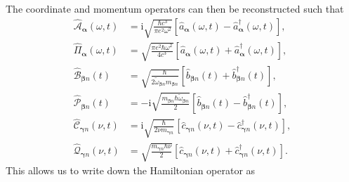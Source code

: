 \documentclass{article}
\begin{document}
The coordinate and momentum operators can then be reconstructed such that
\begin{equation}
\begin{split}
\hat{\mathcal{A}}_{\bm{\alpha}}(\omega,t) &= \mathrm{i}\sqrt{\frac{\hbar c^3}{\pi e^2\omega^2}}\left[\hat{a}_{\bm{\alpha}}(\omega,t) - \hat{a}_{\bm{\alpha}}^\dagger(\omega,t)\right],\\
\hat{\mathit{\Pi}}_{\bm{\alpha}}(\omega,t) &= \sqrt{\frac{\pi e^2\hbar\omega^2}{4 c^3}}\left[\hat{a}_{\bm{\alpha}}(\omega,t) + \hat{a}_{\bm{\alpha}}^\dagger(\omega,t)\right],\\[0.5em]
\hat{\mathcal{B}}_{\bm{\beta}n}(t) &= \sqrt{\frac{\hbar}{2\tilde{\omega}_{\bm{\beta}n}m_{\bm{\beta}n}}}\left[\hat{b}_{\bm{\beta}n}(t) + \hat{b}_{\bm{\beta}n}^\dagger(t)\right],\\
\hat{\mathcal{P}}_{\bm{\beta}n}(t) &= -\mathrm{i}\sqrt{\frac{m_{\bm{\beta}n}\hbar\tilde{\omega}_{\bm{\beta}n}}{2}}\left[\hat{b}_{\bm{\beta}n}(t) - \hat{b}_{\bm{\beta}n}^\dagger(t)\right],\\[0.5em]
\hat{\mathcal{C}}_{\bm{\gamma}n}(\nu,t) &= \mathrm{i}\sqrt{\frac{\hbar}{2\nu m_{\bm{\gamma}n}}}\left[\hat{c}_{\bm{\gamma}n}(\nu,t) - \hat{c}_{\bm{\gamma}n}^\dagger(\nu,t)\right],\\
\hat{\mathcal{Q}}_{\bm{\gamma}n}(\nu,t) &= \sqrt{\frac{m_{\bm{\gamma}n}\hbar\nu}{2}}\left[\hat{c}_{\bm{\gamma}n}(\nu,t) + \hat{c}_{\bm{\gamma}n}^\dagger(\nu,t)\right].
\end{split}
\end{equation}
This allows us to write down the Hamiltonian operator as
\end{document}
